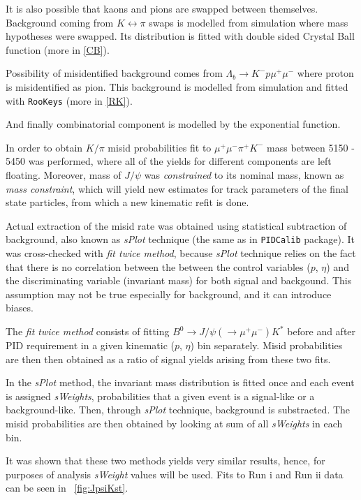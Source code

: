 It is also possible that kaons and pions are swapped between themselves. Background coming from $K \leftrightarrow \pi$ swaps is modelled from simulation where mass hypotheses were swapped. Its distribution is fitted with double sided Crystal Ball function \cite{Skwarnicki:1986xj} (more in \autoref{CB}).

Possibility of misidentified background comes from $\Lambda_{b} \rightarrow K^{-} p \mu^{+} \mu^{-}$ where proton is misidentified as pion. This background is modelled from simulation and fitted with \texttt{RooKeys} (more in \autoref{RK}).

And finally combinatorial component is modelled by the exponential function.

In order to obtain $K/\pi$ misid probabilities fit to $\mu^{+} \mu^{-} \pi^{+} K^{-}$ mass between 5150 - 5450 \mevcc was performed, where all of the yields for different components are left floating. Moreover, mass of $J/\psi$ was \textit{constrained} to its nominal mass, known as \textit{mass constraint}, which will yield new estimates for track parameters of the final state particles, from which a new kinematic refit is done.

Actual extraction of the misid rate was obtained using statistical subtraction of background, also known as \textit{sPlot} technique (the same as in \texttt{PIDCalib} package). It was cross-checked with \textit{fit twice method}, because \textit{sPlot} technique relies on the fact that there is no correlation between the between the control variables ($p$, $\eta$) and the discriminating variable (invariant mass) for both signal and backgound. This assumption may not be true especially for background, and it can introduce biases.

The \textit{fit twice method} consists of fitting $B^{0} \rightarrow J/\psi(\rightarrow \mu^{+} \mu^{-}) K^{*}$ before and after \gls{PID} requirement in a given kinematic ($p$, $\eta$) bin separately. Misid probabilities are then then obtained as a ratio of signal yields arising from these two fits.

In the \textit{sPlot} method, the invariant mass distribution is fitted once and each event is assigned \textit{sWeights}, probabilities that a given event is a signal-like or a background-like. Then, through \textit{sPlot} technique, background is substracted. The misid probabilities are then obtained by looking at sum of all \textit{sWeights} in each bin.

It was shown that these two methods yields very similar results, hence,
for purposes of \Bmumumu analysis \textit{sWeight} values will be used. Fits to Run \Rn{1} and Run \Rn{2} data can be seen in ~\autoref{fig:JpsiKst}.


